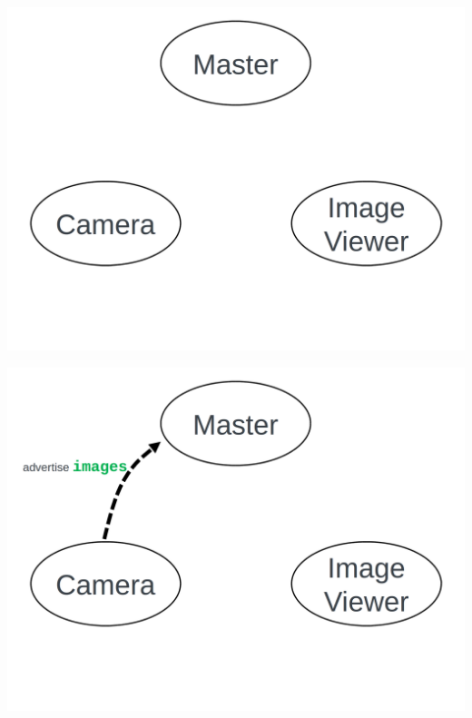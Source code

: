 \documentclass{beamer}
\begin{document}
     \begin{frame}[plain]{}
     \centering
     \includegraphics[width =1.0\linewidth]{figures/master1.png}                                                              
     \end{frame} 
     \begin{frame}[plain]{}
         \centering
         \includegraphics[width =1.0\linewidth]{figures/master2.png}                                                              
      \end{frame} 
\end{document}

